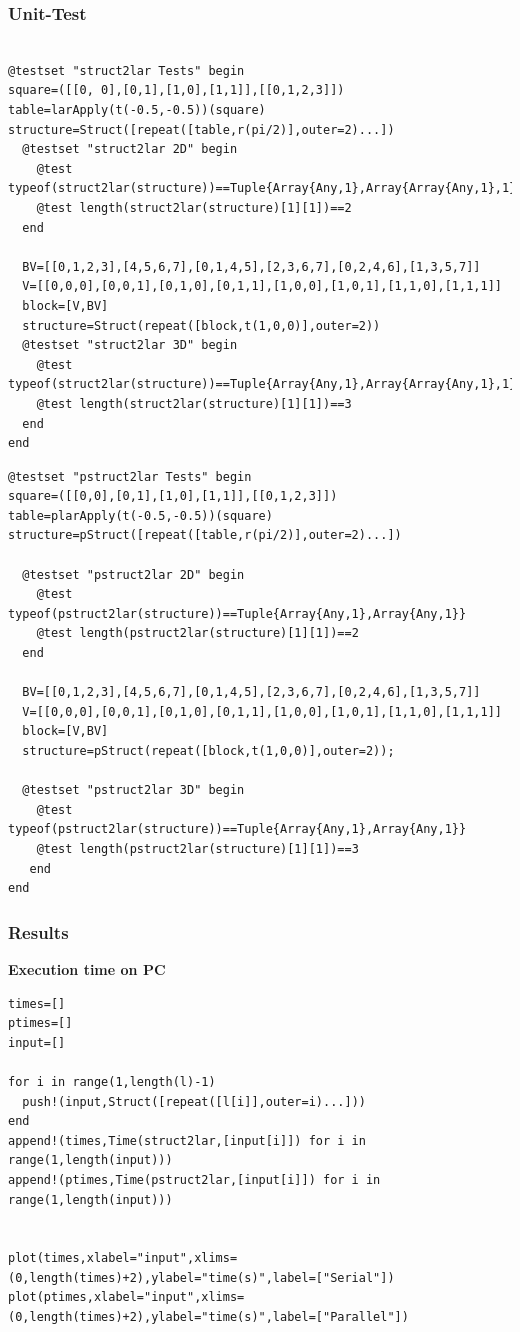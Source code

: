 \documentclass[a4paper,12pt]{article}
\begin{document}
\subsubsection{Unit-Test}
\begin{Verbatim}[fontsize=\footnotesize]

@testset "struct2lar Tests" begin
square=([[0, 0],[0,1],[1,0],[1,1]],[[0,1,2,3]])
table=larApply(t(-0.5,-0.5))(square)
structure=Struct([repeat([table,r(pi/2)],outer=2)...])
  @testset "struct2lar 2D" begin
    @test typeof(struct2lar(structure))==Tuple{Array{Any,1},Array{Array{Any,1},1}}
    @test length(struct2lar(structure)[1][1])==2
  end
  
  BV=[[0,1,2,3],[4,5,6,7],[0,1,4,5],[2,3,6,7],[0,2,4,6],[1,3,5,7]]
  V=[[0,0,0],[0,0,1],[0,1,0],[0,1,1],[1,0,0],[1,0,1],[1,1,0],[1,1,1]]
  block=[V,BV]
  structure=Struct(repeat([block,t(1,0,0)],outer=2))  
  @testset "struct2lar 3D" begin
    @test typeof(struct2lar(structure))==Tuple{Array{Any,1},Array{Array{Any,1},1}}
    @test length(struct2lar(structure)[1][1])==3
  end
end

\end{Verbatim}

\noindent{}
\begin{Verbatim}[fontsize=\footnotesize]
@testset "pstruct2lar Tests" begin
square=([[0,0],[0,1],[1,0],[1,1]],[[0,1,2,3]])
table=plarApply(t(-0.5,-0.5))(square)
structure=pStruct([repeat([table,r(pi/2)],outer=2)...])

  @testset "pstruct2lar 2D" begin    
    @test typeof(pstruct2lar(structure))==Tuple{Array{Any,1},Array{Any,1}}
    @test length(pstruct2lar(structure)[1][1])==2
  end
  
  BV=[[0,1,2,3],[4,5,6,7],[0,1,4,5],[2,3,6,7],[0,2,4,6],[1,3,5,7]]
  V=[[0,0,0],[0,0,1],[0,1,0],[0,1,1],[1,0,0],[1,0,1],[1,1,0],[1,1,1]]
  block=[V,BV]
  structure=pStruct(repeat([block,t(1,0,0)],outer=2));
  
  @testset "pstruct2lar 3D" begin    
    @test typeof(pstruct2lar(structure))==Tuple{Array{Any,1},Array{Any,1}}
    @test length(pstruct2lar(structure)[1][1])==3
   end
end
\end{Verbatim}

\subsubsection{Results}
\textbf{Execution time on PC}
\begin{Verbatim}[fontsize=\footnotesize]
times=[]
ptimes=[]
input=[]

for i in range(1,length(l)-1)
  push!(input,Struct([repeat([l[i]],outer=i)...]))
end
append!(times,Time(struct2lar,[input[i]]) for i in range(1,length(input)))
append!(ptimes,Time(pstruct2lar,[input[i]]) for i in range(1,length(input)))


plot(times,xlabel="input",xlims=(0,length(times)+2),ylabel="time(s)",label=["Serial"])
plot(ptimes,xlabel="input",xlims=(0,length(times)+2),ylabel="time(s)",label=["Parallel"])

\end{Verbatim}
\end{document}
